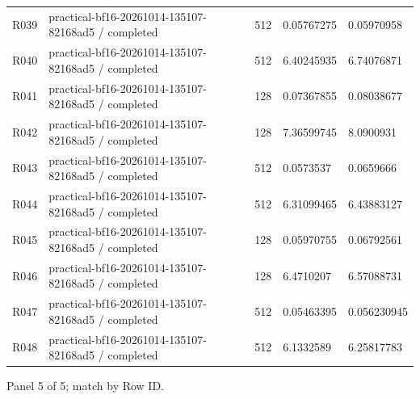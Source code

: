 \documentclass[10pt]{article}
\begin{document}
{\begin{longtable}{p{}p{}p{}p{}p{}}
R039 & practical-bf16-20261014-135107-82168ad5 / completed & 512 & 0.05767275 & 0.05970958 \\
R040 & practical-bf16-20261014-135107-82168ad5 / completed & 512 & 6.40245935 & 6.74076871 \\
R041 & practical-bf16-20261014-135107-82168ad5 / completed & 128 & 0.07367855 & 0.08038677 \\
R042 & practical-bf16-20261014-135107-82168ad5 / completed & 128 & 7.36599745 & 8.0900931 \\
R043 & practical-bf16-20261014-135107-82168ad5 / completed & 512 & 0.0573537 & 0.0659666 \\
R044 & practical-bf16-20261014-135107-82168ad5 / completed & 512 & 6.31099465 & 6.43883127 \\
R045 & practical-bf16-20261014-135107-82168ad5 / completed & 128 & 0.05970755 & 0.06792561 \\
R046 & practical-bf16-20261014-135107-82168ad5 / completed & 128 & 6.4710207 & 6.57088731 \\
R047 & practical-bf16-20261014-135107-82168ad5 / completed & 512 & 0.05463395 & 0.056230945 \\
R048 & practical-bf16-20261014-135107-82168ad5 / completed & 512 & 6.1332589 & 6.25817783 \\
\end{longtable}}
\par\noindent Panel 5 of 5; match by Row ID.
\end{document}
